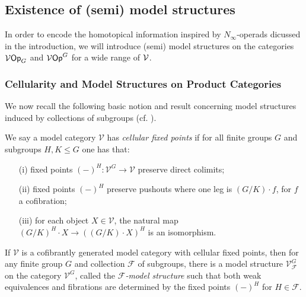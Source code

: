 \documentclass[a4paper,10pt]{article}%
\begin{document}
\subsection{Existence of (semi) model structures} 
\renewcommand{\F}{\ensuremath{\mathcal F}} 

In order to encode the homotopical information inspired by $N_\infty$-operads dicussed in the introduction, we will introduce (semi) model structures on the categories $\mathcal V\mathsf{Op}_G$ and $\mathcal V\mathsf{Op}^G$ for a wide range of $\mathcal V$. 

\subsubsection{Cellularity and Model Structures on Product Categories}

We now recall the following basic notion and result concerning model structures induced by collections of subgroups (cf. \cite[Prop. 2.6]{Ste16}).

\begin{definition}\label{CELL_DEF}
  We say a model category $\mathcal{V}$ has 
  \textit{cellular fixed points} if for all finite groups $G$ and subgroups $H,K\leq G$ one has that:
  \begin{itemize}
  \item[(i)] fixed points $(\minus)^H \colon \mathcal{V}^G \to \mathcal{V}$ preserve direct colimits;
  \item[(ii)] fixed points $(\minus)^H$ preserve pushouts where one leg is $(G/K)\cdot f$, for $f$ a cofibration;
  \item[(iii)] for each object $X \in \mathcal{V}$, the natural map 
    $(G/K)^H \cdot X \to ((G/K) \cdot X)^H$
    is an isomorphism.
  \end{itemize}
\end{definition}

\begin{proposition}\label{FMODELEXIST_PROP}
  If $\mathcal{V}$ is a cofibrantly generated model category with cellular fixed points, then for any finite group $G$ and collection $\F$ of subgroups, there is a model structure $\mathcal{V}^G_{\mathcal{F}}$ on the category 
  $\mathcal{V}^G$, called the 
  \emph{$\mathcal{F}$-model structure}
  such that both weak equivalences and fibrations are determined by the fixed points $(\minus)^H$ for 
  $H \in \mathcal{F}$.
\end{proposition}
\end{document}
